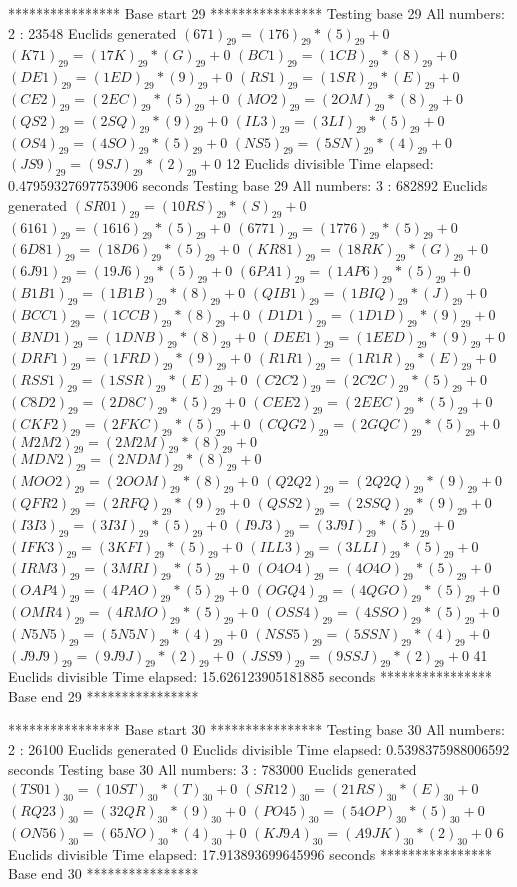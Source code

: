 **************** Base start 29 ****************
Testing base 29 All numbers: 2 :
	 23548 Euclids generated
	$(671)_{29}=(176)_{29}*(5)_{29}+0$
	$(K71)_{29}=(17K)_{29}*(G)_{29}+0$
	$(BC1)_{29}=(1CB)_{29}*(8)_{29}+0$
	$(DE1)_{29}=(1ED)_{29}*(9)_{29}+0$
	$(RS1)_{29}=(1SR)_{29}*(E)_{29}+0$
	$(CE2)_{29}=(2EC)_{29}*(5)_{29}+0$
	$(MO2)_{29}=(2OM)_{29}*(8)_{29}+0$
	$(QS2)_{29}=(2SQ)_{29}*(9)_{29}+0$
	$(IL3)_{29}=(3LI)_{29}*(5)_{29}+0$
	$(OS4)_{29}=(4SO)_{29}*(5)_{29}+0$
	$(NS5)_{29}=(5SN)_{29}*(4)_{29}+0$
	$(JS9)_{29}=(9SJ)_{29}*(2)_{29}+0$
	 12 Euclids divisible
Time elapsed: 0.47959327697753906 seconds
Testing base 29 All numbers: 3 :
	 682892 Euclids generated
	$(SR01)_{29}=(10RS)_{29}*(S)_{29}+0$
	$(6161)_{29}=(1616)_{29}*(5)_{29}+0$
	$(6771)_{29}=(1776)_{29}*(5)_{29}+0$
	$(6D81)_{29}=(18D6)_{29}*(5)_{29}+0$
	$(KR81)_{29}=(18RK)_{29}*(G)_{29}+0$
	$(6J91)_{29}=(19J6)_{29}*(5)_{29}+0$
	$(6PA1)_{29}=(1AP6)_{29}*(5)_{29}+0$
	$(B1B1)_{29}=(1B1B)_{29}*(8)_{29}+0$
	$(QIB1)_{29}=(1BIQ)_{29}*(J)_{29}+0$
	$(BCC1)_{29}=(1CCB)_{29}*(8)_{29}+0$
	$(D1D1)_{29}=(1D1D)_{29}*(9)_{29}+0$
	$(BND1)_{29}=(1DNB)_{29}*(8)_{29}+0$
	$(DEE1)_{29}=(1EED)_{29}*(9)_{29}+0$
	$(DRF1)_{29}=(1FRD)_{29}*(9)_{29}+0$
	$(R1R1)_{29}=(1R1R)_{29}*(E)_{29}+0$
	$(RSS1)_{29}=(1SSR)_{29}*(E)_{29}+0$
	$(C2C2)_{29}=(2C2C)_{29}*(5)_{29}+0$
	$(C8D2)_{29}=(2D8C)_{29}*(5)_{29}+0$
	$(CEE2)_{29}=(2EEC)_{29}*(5)_{29}+0$
	$(CKF2)_{29}=(2FKC)_{29}*(5)_{29}+0$
	$(CQG2)_{29}=(2GQC)_{29}*(5)_{29}+0$
	$(M2M2)_{29}=(2M2M)_{29}*(8)_{29}+0$
	$(MDN2)_{29}=(2NDM)_{29}*(8)_{29}+0$
	$(MOO2)_{29}=(2OOM)_{29}*(8)_{29}+0$
	$(Q2Q2)_{29}=(2Q2Q)_{29}*(9)_{29}+0$
	$(QFR2)_{29}=(2RFQ)_{29}*(9)_{29}+0$
	$(QSS2)_{29}=(2SSQ)_{29}*(9)_{29}+0$
	$(I3I3)_{29}=(3I3I)_{29}*(5)_{29}+0$
	$(I9J3)_{29}=(3J9I)_{29}*(5)_{29}+0$
	$(IFK3)_{29}=(3KFI)_{29}*(5)_{29}+0$
	$(ILL3)_{29}=(3LLI)_{29}*(5)_{29}+0$
	$(IRM3)_{29}=(3MRI)_{29}*(5)_{29}+0$
	$(O4O4)_{29}=(4O4O)_{29}*(5)_{29}+0$
	$(OAP4)_{29}=(4PAO)_{29}*(5)_{29}+0$
	$(OGQ4)_{29}=(4QGO)_{29}*(5)_{29}+0$
	$(OMR4)_{29}=(4RMO)_{29}*(5)_{29}+0$
	$(OSS4)_{29}=(4SSO)_{29}*(5)_{29}+0$
	$(N5N5)_{29}=(5N5N)_{29}*(4)_{29}+0$
	$(NSS5)_{29}=(5SSN)_{29}*(4)_{29}+0$
	$(J9J9)_{29}=(9J9J)_{29}*(2)_{29}+0$
	$(JSS9)_{29}=(9SSJ)_{29}*(2)_{29}+0$
	 41 Euclids divisible
Time elapsed: 15.626123905181885 seconds
**************** Base end 29 ****************

**************** Base start 30 ****************
Testing base 30 All numbers: 2 :
	 26100 Euclids generated
	 0 Euclids divisible
Time elapsed: 0.5398375988006592 seconds
Testing base 30 All numbers: 3 :
	 783000 Euclids generated
	$(TS01)_{30}=(10ST)_{30}*(T)_{30}+0$
	$(SR12)_{30}=(21RS)_{30}*(E)_{30}+0$
	$(RQ23)_{30}=(32QR)_{30}*(9)_{30}+0$
	$(PO45)_{30}=(54OP)_{30}*(5)_{30}+0$
	$(ON56)_{30}=(65NO)_{30}*(4)_{30}+0$
	$(KJ9A)_{30}=(A9JK)_{30}*(2)_{30}+0$
	 6 Euclids divisible
Time elapsed: 17.913893699645996 seconds
**************** Base end 30 ****************

